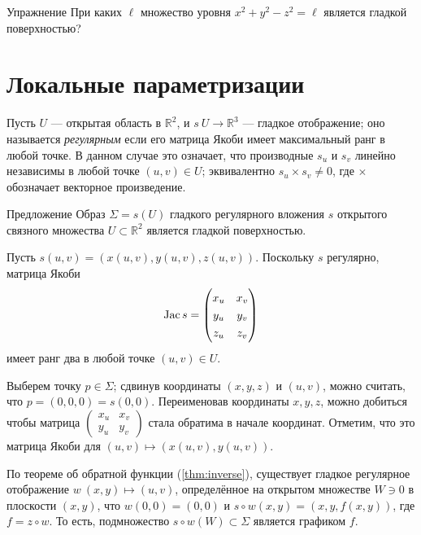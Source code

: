 \begin{thm}{Упражнение}\label{ex:hyperboloids}
При каких $\ell$ множество уровня $x^2+y^2-z^2=\ell$ является гладкой поверхностью?
\end{thm}

\section{Локальные параметризации}

Пусть $U$ --- открытая область в $\mathbb{R}^2$, и $s\:U\to \mathbb{R}^3$ --- гладкое отображение;
оно называется \emph{регулярным} если его матрица Якоби имеет максимальный ранг в любой точке.
В данном случае это означает, что производные $s_u$ и $s_v$ линейно независимы в любой точке $(u,v)\in U$;
эквивалентно $s_u\times s_v\ne 0$, где $\times$ обозначает векторное произведение.

\begin{thm}{Предложение}\label{prop:graph-chart}
Образ $\Sigma=s(U)$ гладкого регулярного вложения $s$ открытого связного множества $U\subset \mathbb{R}^2$ является гладкой поверхностью.
\end{thm}

Пусть $s(u,v)=(x(u,v),y(u,v),z(u,v))$.
Поскольку $s$ регулярно, матрица Якоби
\[\Jac s=
\renewcommand\arraystretch{1.3}
\begin{pmatrix}
x_u&x_v\\
y_u&y_v\\
z_u&z_v
\end{pmatrix}
\]
имеет ранг два в любой точке $(u,v)\in U$.

Выберем точку $p\in \Sigma$; сдвинув координаты $(x,y,z)$ и $(u,v)$, можно считать, что $p = (0,0, 0) =s(0,0)$.
Переименовав координаты $x,y,z$, можно добиться чтобы 
матрица $\left(\begin{smallmatrix}
x_u&x_v\\
y_u&y_v
\end{smallmatrix}\right)$
стала обратима в начале координат.
Отметим, что это матрица Якоби для $(u,v)\mapsto (x(u,v),y(u,v))$.

По теореме об обратной функции (\ref{thm:inverse}), существует гладкое регулярное отображение
$w\:(x,y)\mapsto (u,v)$, определённое на открытом множестве $W\ni 0$ в плоскости $(x,y)$,
 что $w(0,0)=(0,0)$ и $s\circ w(x,y)=(x,y,f(x,y))$, где $f=z\circ w$.
То есть, подмножество $s\circ w(W)\subset \Sigma$ является графиком $f$.

